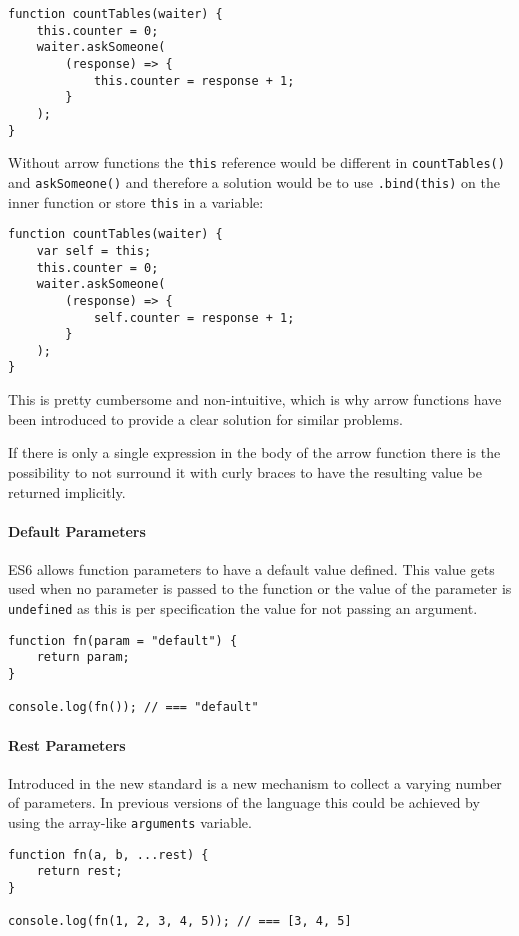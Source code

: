 \documentclass{bioinfo}
\begin{document}
\begin{lstlisting}
function countTables(waiter) {
    this.counter = 0;
    waiter.askSomeone(
        (response) => {
            this.counter = response + 1;
        }
    );
}
\end{lstlisting}

Without arrow functions the {\tt this} reference would be different in
{\tt countTables()} and {\tt askSomeone()} and therefore a
solution would be to use {\tt .bind(this)} on the inner function or store
{\tt this} in a variable:

\begin{lstlisting}
function countTables(waiter) {
    var self = this;
    this.counter = 0;
    waiter.askSomeone(
        (response) => {
            self.counter = response + 1;
        }
    );
}
\end{lstlisting}

This is pretty cumbersome and non-intuitive, which is why arrow functions
have been introduced to provide a clear solution for similar problems.

If there is only a single expression in the body of the arrow function there is
the possibility to not surround it with curly braces to have the resulting value
be returned implicitly.

\paragraph{Default Parameters\textcolon}
ES6 allows function parameters to have a default value defined. This value gets used when
no parameter is passed to the function or the value of the parameter is {\tt undefined} as
this is per specification the value for not passing an argument.

\begin{lstlisting}
function fn(param = "default") {
    return param;
}

console.log(fn()); // === "default"
\end{lstlisting}

\paragraph{Rest Parameters\textcolon}
Introduced in the new standard is a new mechanism to collect a varying number of parameters.
In previous versions of the language this could be achieved by using the array-like
{\tt arguments} variable.

\begin{lstlisting}
function fn(a, b, ...rest) {
    return rest;
}

console.log(fn(1, 2, 3, 4, 5)); // === [3, 4, 5]
\end{lstlisting}
\end{document}
